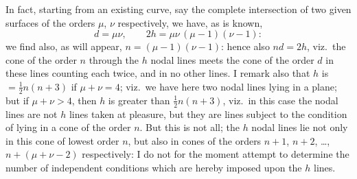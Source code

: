 \documentclass[11pt]{article}
\begin{document}
In fact, starting from an existing curve, say the complete intersection of two given surfaces of the orders $\mu$, $\nu$ respectively, we have, as is known,
\[
d = \mu\nu,\qquad 2h = \mu\nu\,(\mu-1)(\nu-1):
\]
we find also, as will appear, $n = (\mu-1)(\nu-1)$: hence also $nd = 2h$, viz.\ the cone of the order $n$ through the $h$ nodal lines meets the cone of the order $d$ in these lines counting each twice, and in no other lines.  I remark also that $h$ is $=\tfrac{1}{2}n(n+3)$ if $\mu+\nu = 4$; viz.\ we have here two nodal lines lying in a plane; but if $\mu+\nu > 4$, then $h$ is greater than $\tfrac{1}{2}n(n+3)$, viz.\ in this case the nodal lines are not $h$ lines taken at pleasure, but they are lines subject to the condition of lying in a cone of the order $n$.  But this is not all; the $h$ nodal lines lie not only in this cone of lowest order $n$, but also in cones of the orders $n+1$, $n+2$, \dots, $n+(\mu+\nu-2)$ respectively: I do not for the moment attempt to determine the number of independent conditions which are hereby imposed upon the $h$ lines.
\end{document}
